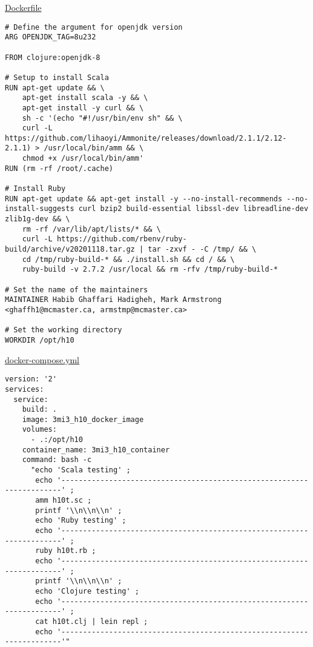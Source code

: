 \documentclass[11pt]{article}
\begin{document}
\href{./testing/h10/Dockerfile}{Dockerfile}
\begin{verbatim}
# Define the argument for openjdk version
ARG OPENJDK_TAG=8u232

FROM clojure:openjdk-8

# Setup to install Scala
RUN apt-get update && \
    apt-get install scala -y && \
    apt-get install -y curl && \
    sh -c '(echo "#!/usr/bin/env sh" && \
    curl -L https://github.com/lihaoyi/Ammonite/releases/download/2.1.1/2.12-2.1.1) > /usr/local/bin/amm && \
    chmod +x /usr/local/bin/amm'
RUN (rm -rf /root/.cache)

# Install Ruby
RUN apt-get update && apt-get install -y --no-install-recommends --no-install-suggests curl bzip2 build-essential libssl-dev libreadline-dev zlib1g-dev && \
    rm -rf /var/lib/apt/lists/* && \
    curl -L https://github.com/rbenv/ruby-build/archive/v20201118.tar.gz | tar -zxvf - -C /tmp/ && \
    cd /tmp/ruby-build-* && ./install.sh && cd / && \
    ruby-build -v 2.7.2 /usr/local && rm -rfv /tmp/ruby-build-*

# Set the name of the maintainers
MAINTAINER Habib Ghaffari Hadigheh, Mark Armstrong <ghaffh1@mcmaster.ca, armstmp@mcmaster.ca>

# Set the working directory
WORKDIR /opt/h10
\end{verbatim}

\href{./testing/h10/docker-compose.yml}{docker-compose.yml}
\begin{verbatim}
version: '2'
services:
  service:
    build: .
    image: 3mi3_h10_docker_image
    volumes:
      - .:/opt/h10
    container_name: 3mi3_h10_container
    command: bash -c
      "echo 'Scala testing' ;
       echo '----------------------------------------------------------------------' ;
       amm h10t.sc ;
       printf '\\n\\n\\n' ;
       echo 'Ruby testing' ;
       echo '----------------------------------------------------------------------' ;
       ruby h10t.rb ;
       echo '----------------------------------------------------------------------' ;
       printf '\\n\\n\\n' ;
       echo 'Clojure testing' ;
       echo '----------------------------------------------------------------------' ;
       cat h10t.clj | lein repl ;
       echo '----------------------------------------------------------------------'"
\end{verbatim}
\end{document}
